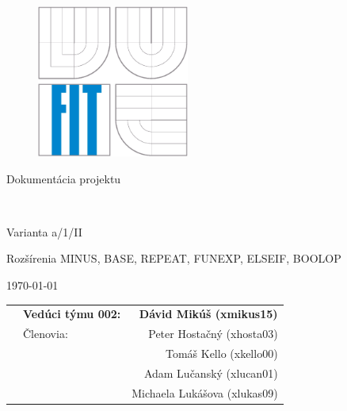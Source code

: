 \begin{titlepage}

\begin{figure}[!h]
  \centering
  \includegraphics[height=5cm]{img/logo.eps}
\end{figure}

\vfill

\begin{center}
\begin{Large}
Dokumentácia projektu\\
\end{Large}

\bigskip

	\begin{Huge}
		\projname\\
	\end{Huge}

	\begin{large}
		Varianta a/1/II\\
		{\small Rozšírenia MINUS, BASE, REPEAT, FUNEXP, ELSEIF, BOOLOP \par}
	\end{large}
\end{center}

\vfill

\begin{center}
\begin{Large}
\today
\end{Large}
\end{center}

\vfill

\begin{flushleft}

	\begin{large}
		\begin{tabularx}{\linewidth}{Xlr}
		   & \textbf{Vedúci týmu 002:} & \textbf{Dávid Mikúš (xmikus15)} \\
		   & Členovia: & Peter Hostačný (xhosta03) \\
		   &           & Tomáš Kello (xkello00) \\
		   &           & Adam Lučanský (xlucan01) \\
		   &           & Michaela Lukášova (xlukas09)
		\end{tabularx}
	\end{large}
\end{flushleft}
\end{titlepage}

